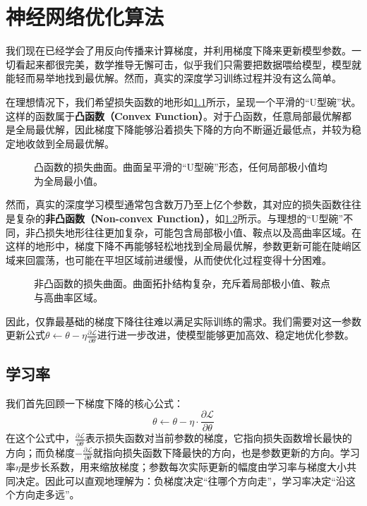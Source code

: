 
\chapter{神经网络优化算法}

我们现在已经学会了用反向传播来计算梯度，并利用梯度下降来更新模型参数。一切看起来都很完美，数学推导无懈可击，似乎我们只需要把数据喂给模型，模型就能轻而易举地找到最优解。然而，真实的深度学习训练过程并没有这么简单。

在理想情况下，我们希望损失函数的地形如\cref{fig:convex_landscape}所示，呈现一个平滑的“U型碗”状。这样的函数属于\textbf{凸函数（Convex Function）}。对于凸函数，任意局部最优解都是全局最优解，因此梯度下降能够沿着损失下降的方向不断逼近最低点，并较为稳定地收敛到全局最优解。
\begin{figure}[H]
    \caption{凸函数的损失曲面。曲面呈平滑的“U型碗”形态，任何局部极小值均为全局最小值。}
    \label{fig:convex_landscape}
\end{figure}

然而，真实的深度学习模型通常包含数万乃至上亿个参数，其对应的损失函数往往是复杂的\textbf{非凸函数（Non-convex Function）}，如\cref{fig:nonconvex_landscape}所示。与理想的“U型碗”不同，非凸损失地形往往更加复杂，可能包含局部极小值、鞍点以及高曲率区域。在这样的地形中，梯度下降不再能够轻松地找到全局最优解，参数更新可能在陡峭区域来回震荡，也可能在平坦区域前进缓慢，从而使优化过程变得十分困难。
\begin{figure}[H]
    \caption{非凸函数的损失曲面。曲面拓扑结构复杂，充斥着局部极小值、鞍点与高曲率区域。}
    \label{fig:nonconvex_landscape}
\end{figure}

因此，仅靠最基础的梯度下降往往难以满足实际训练的需求。我们需要对这一参数更新公式$\theta\leftarrow\theta-\eta\frac{\partial\mathcal{L}}{\partial\theta}$进行进一步改进，使模型能够更加高效、稳定地优化参数。

\section{学习率}

我们首先回顾一下梯度下降的核心公式：
$$
\theta \leftarrow \theta - \eta \cdot \frac{\partial \mathcal{L}}{\partial \theta}
$$
在这个公式中，$\frac{\partial \mathcal{L}}{\partial \theta}$表示损失函数对当前参数的梯度，它指向损失函数增长最快的方向；而负梯度$-\frac{\partial \mathcal{L}}{\partial \theta}$就指向损失函数下降最快的方向，也是参数更新的方向。学习率$\eta$是步长系数，用来缩放梯度；参数每次实际更新的幅度由学习率与梯度大小共同决定。因此可以直观地理解为：负梯度决定“往哪个方向走”，学习率决定“沿这个方向走多远”。

